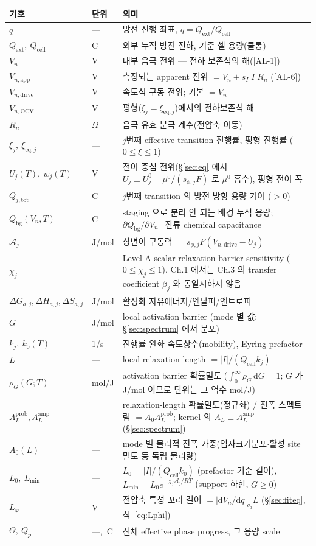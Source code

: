 \documentclass[11pt,a4paper]{article}
\newcommand{\dd}{\mathrm{d}}
\newcommand{\eq}{\mathrm{eq}}
\newcommand{\app}{\mathrm{app}}
\newcommand{\drive}{\mathrm{drive}}
\newcommand{\bg}{\mathrm{bg}}
\newcommand{\cell}{\mathrm{cell}}
\newcommand{\ext}{\mathrm{ext}}
\newcommand{\OCV}{\mathrm{OCV}}
\newcommand{\tot}{\mathrm{tot}}
\newcommand{\AL}[1]{\textsf{[AL-#1]}}
\begin{document}
\begin{longtable}{p{} p{} p{}}
\toprule 기호 & 단위 & 의미 \\ \midrule \endhead
$q$ & --- & 방전 진행 좌표, $q=Q_\ext/Q_\cell$ \\
$Q_\ext,\ Q_\cell$ & C & 외부 누적 방전 전하, 기준 셀 용량(쿨롱) \\
$V_n$ & V & 내부 음극 전위 — 전하 보존식의 해(\AL{1}) \\
$V_{n,\app}$ & V & 측정되는 apparent 전위 $=V_n+s_I|I|R_n$ (\AL{6}) \\
$V_{n,\drive}$ & V & 속도식 구동 전위; 기본 $=V_n$ \\
$V_{n,\OCV}$ & V & 평형($\xi_j=\xi_{\eq,j}$)에서의 전하보존식 해 \\
$R_n$ & $\Omega$ & 음극 유효 분극 계수(전압축 이동) \\
$\xi_j,\ \xi_{\eq,j}$ & --- & $j$번째 effective transition 진행률, 평형 진행률 ($0\!\le\!\xi\!\le\!1$) \\
$U_j(T),\ w_j(T)$ & V & 전이 중심 전위(\S\ref{sec:eq} 에서 $U_j\equiv U_j^0-\mu^0/(s_{\phi,j}F)$ 로 $\mu^0$ 흡수), 평형 전이 폭 \\
$Q_{j,\tot}$ & C & $j$번째 transition 의 방전 방향 용량 기여 ($>0$) \\
$Q_\bg(V_n,T)$ & C & staging 으로 분리 안 되는 배경 누적 용량; $\partial Q_\bg/\partial V_n$=잔류 chemical capacitance \\
$\mathcal A_j$ & J/mol & 상변이 구동력 $=s_{\phi,j}F(V_{n,\drive}-U_j)$ \\
$\chi_j$ & --- & Level-A scalar relaxation-barrier sensitivity ($0\le\chi_j\le1$). Ch.1 에서는 Ch.3 의 transfer coefficient $\beta_j$ 와 동일시하지 않음 \\
$\Delta G_{a,j},\Delta H_{a,j},\Delta S_{a,j}$ & J/mol & 활성화 자유에너지/엔탈피/엔트로피 \\
$G$ & J/mol & local activation barrier (mode 별 값; \S\ref{sec:spectrum} 에서 분포) \\
$k_j,\ k_0(T)$ & 1/s & 진행률 완화 속도상수(mobility), Eyring prefactor \\
$L$ & --- & local relaxation length $=|I|/(Q_\cell k_j)$ \\
$\rho_G(G;T)$ & mol/J & activation barrier 확률밀도 ($\int_0^\infty\rho_G\,\dd G=1$; $G$ 가 J/mol 이므로 단위는 그 역수 mol/J) \\
$A_L^{\mathrm{prob}},A_L^{\mathrm{amp}}$ & --- & relaxation-length 확률밀도(정규화) / 진폭 스펙트럼 $=A_0 A_L^{\mathrm{prob}}$; kernel 의 $A_L\equiv A_L^{\mathrm{amp}}$ (\S\ref{sec:spectrum}) \\
$A_0(L)$ & --- & mode 별 물리적 진폭 가중(입자크기분포$\cdot$활성 site 밀도 등 독립 물리량) \\
$L_0,\ L_{\min}$ & --- & $L_0=|I|/(Q_\cell k_0)$ (prefactor 기준 길이), $L_{\min}=L_0 e^{-\chi_j\mathcal A_j/RT}$ (support 하한, $G\!\ge\!0$) \\
$L_\varphi$ & V & 전압축 특성 꼬리 길이 $=|\dd V_n/\dd q|_{q_a}L$ (\S\ref{sec:fiteq}, 식~\eqref{eq:Lphi}) \\
$\Theta,\ Q_p$ & ---,\ C & 전체 effective phase progress, 그 용량 scale \\
\bottomrule
\end{longtable}
\end{document}
